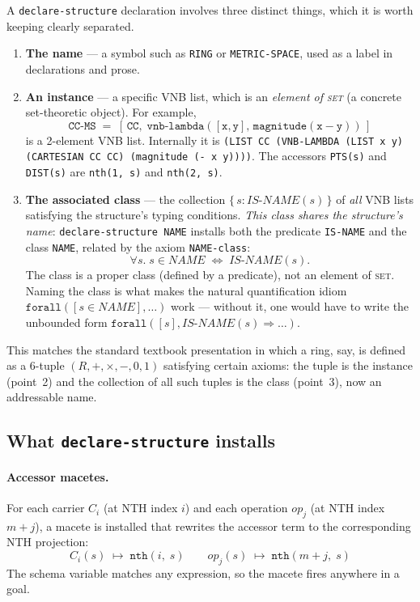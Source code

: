 \begin{remark}
A \texttt{declare-structure} declaration involves three distinct things,
which it is worth keeping clearly separated.
\begin{enumerate}
\item \textbf{The name} --- a symbol such as \texttt{RING} or
  \texttt{METRIC-SPACE}, used as a label in declarations and prose.
\item \textbf{An instance} --- a specific VNB list, which is an
  \emph{element of \textsc{set}} (a concrete set-theoretic object).
  For example,
  \[
    \mathtt{CC\text{-}MS} \;=\;
      [\,\mathtt{CC},\;\mathtt{vnb\text{-}lambda}([\mathtt{x},\mathtt{y}],\,
      \mathtt{magnitude}(\mathtt{x}-\mathtt{y}))\,]
  \]
  is a 2-element VNB list.  Internally it is \texttt{(LIST CC (VNB-LAMBDA
  (LIST x y) (CARTESIAN CC CC) (magnitude (- x y))))}.  The accessors \texttt{PTS(s)} and
  \texttt{DIST(s)} are \texttt{nth(1,~s)} and \texttt{nth(2,~s)}.
\item \textbf{The associated class} --- the collection
  $\{\,s : \mathit{IS\text{-}NAME}(s)\,\}$ of \emph{all} VNB lists
  satisfying the structure's typing conditions.  \emph{This class
  shares the structure's name}: \texttt{declare-structure NAME}
  installs both the predicate \texttt{IS-NAME} and the class
  \texttt{NAME}, related by the axiom \texttt{NAME-class}:
  \[
    \forall s.\; s \in \mathit{NAME} \;\Leftrightarrow\; \mathit{IS\text{-}NAME}(s).
  \]
  The class is a proper class (defined by a predicate), not an
  element of \textsc{set}.  Naming the class is what makes the
  natural quantification idiom
  $\texttt{forall}([s \in \mathit{NAME}], \ldots)$
  work --- without it, one would have to write the unbounded form
  $\texttt{forall}([s], \mathit{IS\text{-}NAME}(s) \Rightarrow \ldots)$.
\end{enumerate}
This matches the standard textbook presentation in which a ring, say,
is defined as a 6-tuple $(R,+,\times,-,0,1)$ satisfying certain axioms:
the tuple is the instance (point~2) and the collection of all such tuples
is the class (point~3), now an addressable name.
\end{remark}

\subsection{What \texttt{declare-structure} installs}

\paragraph{Accessor macetes.}
For each carrier $C_i$ (at NTH index $i$) and each operation
$\mathit{op}_j$ (at NTH index $m+j$), a macete is installed that
rewrites the accessor term to the corresponding NTH projection:
\[
  C_i(s) \;\longmapsto\; \texttt{nth}(i,\; s)
  \qquad
  \mathit{op}_j(s) \;\longmapsto\; \texttt{nth}(m{+}j,\; s)
\]
The schema variable matches any expression, so the macete fires anywhere
in a goal.

